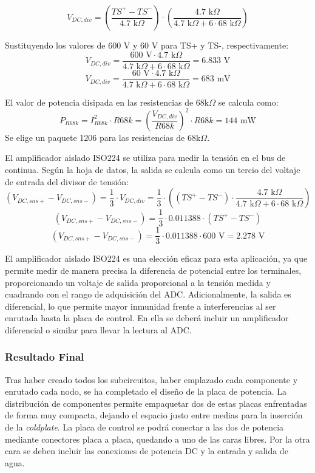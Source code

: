 \[ V_{DC,div} = \left( \frac{TS^+ - TS^-}{4.7 \text{ k}\Omega} \right) \cdot \left( \frac{4.7 \text{ k}\Omega}{4.7 \text{ k}\Omega + 6 \cdot 68 \text{ k}\Omega} \right) \]

Sustituyendo los valores de 600 V y 60 V para TS+ y TS-, respectivamente:
\[ V_{DC,div} = \frac{600 \text{ V} \cdot 4.7 \text{ k}\Omega}{4.7 \text{ k}\Omega + 6 \cdot 68 \text{ k}\Omega} = 6.833 \text{ V} \]
\[ V_{DC,div} = \frac{60 \text{ V} \cdot 4.7 \text{ k}\Omega}{4.7 \text{ k}\Omega + 6 \cdot 68 \text{ k}\Omega} = 683 \text{ mV} \]

El valor de potencia disipada en las resistencias de 68k$\Omega$ se calcula como:
\[ P_{R68k} = I_{R68k}^2 \cdot R68k = \left( \frac{V_{DC,div}}{R68k} \right)^2 \cdot R68k = 144 \text{ mW} \]
Se elige un paquete 1206 para las resistencias de 68k$\Omega$.

El amplificador aislado ISO224 se utiliza para medir la tensión en el bus de continua. Según la hoja de datos, la salida se calcula como un tercio del voltaje de entrada del divisor de tensión:
\[ (V_{DC,sns+} - V_{DC,sns-}) = \frac{1}{3} \cdot V_{DC,div} = \frac{1}{3} \cdot \left( (TS^+ - TS^-) \cdot \frac{4.7 \text{ k}\Omega}{4.7 \text{ k}\Omega + 6 \cdot 68 \text{ k}\Omega} \right) \]
\[ (V_{DC,sns+} - V_{DC,sns-}) = \frac{1}{3} \cdot 0.011388 \cdot (TS^+ - TS^-) \]
\[ (V_{DC,sns+} - V_{DC,sns-}) = \frac{1}{3} \cdot 0.011388 \cdot 600 \text{ V} = 2.278 \text{ V} \]

El amplificador aislado ISO224 es una elección eficaz para esta aplicación, ya que permite medir de manera precisa la diferencia de potencial entre los terminales, proporcionando un voltaje de salida proporcional a la tensión medida y cuadrando con el rango de adquisición del ADC. Adicionalmente, la salida es diferencial, lo que permite mayor inmunidad frente a interferencias al ser enrutada hasta la placa de control. En ella se deberá incluir un amplificador diferencial o similar para llevar la lectura al ADC.

\subsubsection{Resultado Final}

Tras haber creado todos los subcircuitos, haber emplazado cada componente y enrutado cada nodo, se ha completado el diseño de la placa de potencia. La distribución de componentes permite empaquetar dos de estas placas enfrentadas de forma muy compacta, dejando el espacio justo entre medias para la inserción de la \textit{coldplate}. La placa de control se podrá conectar a las dos de potencia mediante conectores placa a placa, quedando a uno de las caras libres. Por la otra cara se deben incluir las conexiones de potencia DC y la entrada y salida de agua.


